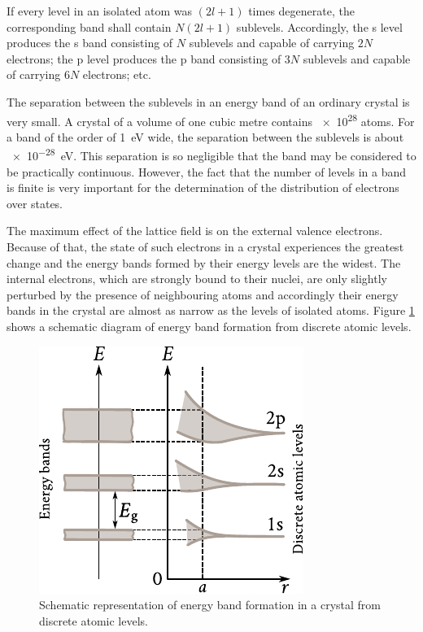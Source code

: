 If every level in an isolated atom was $(2l+1)$ times degenerate, the corresponding band shall contain $N(2l+1)$ sublevels. Accordingly, the s level produces the s band consisting of $N$ sublevels and capable of carrying $2N$ electrons; the p level produces the p band consisting of $3N$ sublevels and capable of carrying $6N$ electrons; etc.

The separation between the sublevels in an energy band of an ordinary crystal is very small. A crystal of a volume of one cubic metre contains \num{e28} atoms. For a band of the order of \SI{1}{\electronvolt} wide, the separation between the sublevels is about \SI{e-28}{\electronvolt}. This separation is so negligible that the band may be considered to be practically continuous. However, the fact that the number of levels in a band is finite is very important for the determination of the distribution of electrons over states.

The maximum effect of the lattice field is on the external valence electrons. Because of that, the state of such electrons in a crystal experiences the greatest change and the energy bands formed by their energy levels are the widest. The internal electrons, which are strongly bound to their nuclei, are only slightly perturbed by the presence of neighbouring atoms and accordingly their energy bands in the crystal are almost as narrow as the levels of isolated atoms. Figure \ref{fig:5_6} shows a schematic diagram of energy band formation from discrete atomic levels.

\begin{figure}[t]
	\begin{center}
		\includegraphics[scale=1]{figures/ch_05/fig_5_6.pdf}
		\caption[]{Schematic representation of energy band formation in a crystal from discrete atomic levels.}
		\label{fig:5_6}
	\end{center}
	\vspace{-0.7cm}
\end{figure}


